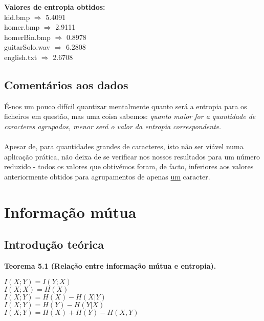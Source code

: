 \documentclass{article}
\begin{document}
\textbf{Valores de entropia obtidos:}\\
kid.bmp $\Rightarrow$ 5.4091\\
homer.bmp $\Rightarrow$ 2.9111\\
homerBin.bmp $\Rightarrow$ 0.8978\\
guitarSolo.wav $\Rightarrow$ 6.2808\\
english.txt $\Rightarrow$ 2.6708\\

\subsection{Comentários aos dados}

É-nos um pouco difícil quantizar mentalmente quanto será a entropia para os ficheiros em questão, mas uma coisa sabemos: \textit{quanto maior for a quantidade de caracteres agrupados, menor será o valor da entropia correspondente}. \\\\Apesar de, para quantidades grandes de caracteres, isto não ser viável numa aplicação prática, não deixa de se verificar nos nossos resultados para um número reduzido - todos os valores que obtivémos foram, de facto, inferiores aos valores anteriormente obtidos para agrupamentos de apenas \underline{um} caracter.

\section{Informação mútua}

\subsection{Introdução teórica}

\begin{comment}
A informação mútua, de uma maneira simples, é uma medida da quantidade de informação que uma variável aleatória contém acerca da outra.
\end{comment}

\textbf{Teorema 5.1 (Relação entre informação mútua e entropia).}
\begin{center}
$I(X;Y) = I(Y;X)$\\
$I(X;X) = H(X)$\\
$I(X;Y) = H(X) - H(X|Y)$\\
$I(X;Y) = H(Y) - H(Y|X)$\\
$I(X;Y) = H(X) + H(Y) - H(X,Y)$
\end{center}
\end{document}
